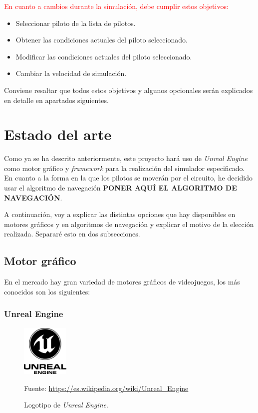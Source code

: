 \documentclass[a4paper,11pt]{book}
\begin{document}
\bigskip

\textcolor{red}{En cuanto a cambios durante la simulación, debe cumplir estos objetivos:}

\begin{itemize}
   \item Seleccionar piloto de la lista de pilotos.
   \item Obtener las condiciones actuales del piloto seleccionado.
   \item Modificar las condiciones actuales del piloto seleccionado.
   \item Cambiar la velocidad de simulación.
\end{itemize}

Conviene resaltar que todos estos objetivos y algunos opcionales serán explicados en detalle en apartados siguientes.

\section{Estado del arte}
Como ya se ha descrito anteriormente, este proyecto hará uso de \textit{Unreal Engine} como motor gráfico y \textit{framework} para la realización del simulador especificado. En cuanto a la forma en la que los pilotos se moverán por el circuito, he decidido usar el algoritmo de navegación \textbf{PONER AQUÍ EL ALGORITMO DE NAVEGACIÓN}.

\bigskip

A continuación, voy a explicar las distintas opciones que hay disponibles en motores gráficos y en algoritmos de navegación y explicar el motivo de la elección realizada. Separaré esto en dos subsecciones.

\subsection{Motor gráfico}
En el mercado hay gran variedad de motores gráficos de videojuegos, los más conocidos son los siguientes:

\subsubsection{Unreal Engine}

\begin{figure}[H]
   \centering
   \includegraphics[width=0.2\textwidth]{imagenes/UE_LOGO.png}
   \caption{Logotipo de \textit{Unreal Engine}.}
   \vspace{10pt}
   \footnotesize{Fuente: \url{https://es.wikipedia.org/wiki/Unreal_Engine}}
\end{figure}
\end{document}
